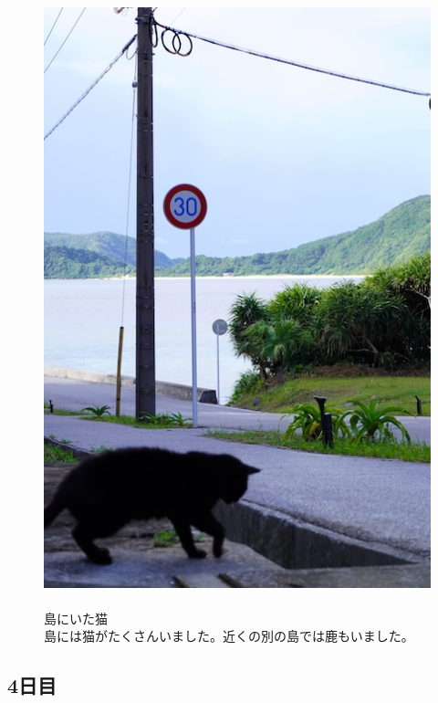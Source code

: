 \documentclass[../main]{subfiles}
\begin{document}
\begin{figure}[H]
  \begin{minipage}[b]{0.48\columnwidth}
    \centering
    \includegraphics[width=0.9\columnwidth]{figure/zamami_neko.jpg}
  \end{minipage}
  \hspace{0.04\columnwidth} %
  \begin{minipage}[b]{0.48\columnwidth}
    \caption{\\
    島にいた猫\\
    島には猫がたくさんいました。近くの別の島では鹿もいました。
    }
  \end{minipage}
\end{figure}

\subsection{4日目}
\end{document}
